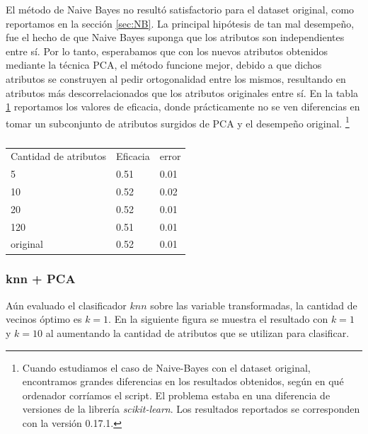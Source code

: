 \documentclass[a4paper,10pt]{article}
\begin{document}
\par El método de Naive Bayes no resultó satisfactorio para el dataset original, como reportamos en la sección \ref{sec:NB}. La principal hipótesis de tan mal desempeño, fue el hecho de que Naive Bayes suponga que los atributos son independientes entre sí. Por lo tanto, esperabamos que con los nuevos atributos obtenidos mediante la técnica PCA, el método funcione mejor, debido a que dichos atributos se construyen al pedir ortogonalidad entre los mismos, resultando en atributos más descorrelacionados que los atributos originales entre sí. En la tabla \ref{table:NB} reportamos los valores de eficacia, donde prácticamente no se ven diferencias en tomar un subconjunto de atributos surgidos de PCA y el desempeño original. \footnote{Cuando estudiamos el caso de Naive-Bayes con el dataset original, encontramos grandes diferencias en los resultados obtenidos, según en qué ordenador corríamos el script. El problema estaba en una diferencia de versiones de la librería \emph{scikit-learn}. Los resultados reportados se corresponden con la versión 0.17.1.}

\begin{table}
\centering
\caption{}
\label{table:NB}
\begin{tabular}{lll}
Cantidad de atributos & Eficacia & error \\
5 & 0.51 & 0.01 \\
10 & 0.52 & 0.02 \\
20 & 0.52 & 0.01 \\
120 & 0.51 & 0.01 \\
original & 0.52 & 0.01 \\
\end{tabular}
\end{table}

\subsubsection{knn + PCA}

A\'un evaluado el clasificador $knn$ sobre las variable transformadas, la cantidad de vecinos \'optimo es $k=1$. En la siguiente figura se muestra el resultado con $k=1$ y $k=10$ al aumentando la cantidad de atributos que se utilizan para clasificar.  
\end{document}
